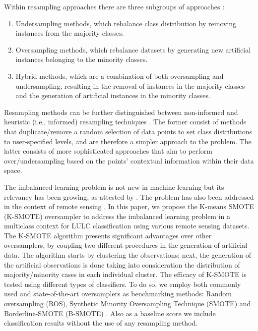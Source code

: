 \documentclass[parskip=full]{scrartcl}
\begin{document}
Within resampling approaches there are three subgroups of approaches
\cite{Fernandez2013,Kaur2019,Luengo2020}:

\begin{enumerate}
    \item Undersampling methods, which rebalance class distribution by removing
        instances from the majority classes.
    \item Oversampling methods, which rebalance datasets by generating new
        artificial instances belonging to the minority classes.
    \item Hybrid methods, which are a combination of both oversampling and
        undersampling, resulting in the removal of instances in the majority
        classes and the generation of artificial instances in the minority
        classes.
\end{enumerate}

Resampling methods can be further distinguished between non-informed and
heuristic (i.e., informed) resampling techniques
\cite{Fernandez2013,Luengo2020,Garcia2016}. The former consist of methods that
duplicate/remove a random selection of data points to set class distributions to
user-specified levels, and are therefore a simpler approach to the problem. The
latter consists of more sophisticated approaches that aim to perform
over/undersampling based on the points' contextual information within their data
space.

The imbalanced learning problem is not new in machine learning but its relevancy
has been growing, as attested by \cite{Haixiang2017}. The problem has also been
addressed in the context of remote sensing \cite{Douzas2019rs}. In this paper,
we propose the K-means SMOTE (K-SMOTE) \cite{Douzas2018} oversampler to address
the imbalanced learning problem in a multiclass context for LULC classification
using various remote sensing datasets. The K-SMOTE algorithm presents
significant advantages over other oversamplers, by coupling two different
procedures in the generation of artificial data. The algorithm starts by
clustering the observations; next, the generation of the artificial observations
is done taking into consideration the distribution of majority/minority cases in
each individual cluster. The efficacy of K-SMOTE is tested using
different types of classifiers. To do so, we employ both commonly used and
state-of-the-art oversamplers as benchmarking methods: Random oversampling
(ROS), Synthetic Minority Oversampling Technique (SMOTE) \cite{Chawla2002} and
Borderline-SMOTE (B-SMOTE) \cite{Han2005}. Also as a baseline score we include
classification results without the use of any resampling method.
\end{document}
